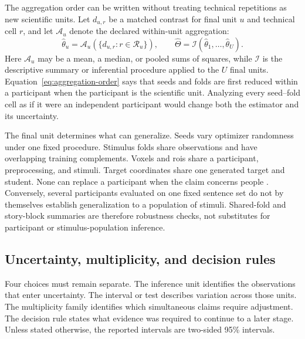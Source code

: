The aggregation order can be written without treating technical repetitions as new scientific units.
Let \(d_{u,r}\) be a matched contrast for final unit \(u\) and technical cell \(r\), and let \(\mathcal A_u\) denote the declared within-unit aggregation:
\begin{equation}
  \widehat\theta_u
  =
  \mathcal A_u\!\left(\{d_{u,r}:r\in\mathcal R_u\}\right),
  \qquad
  \widehat\Theta
  =
  \mathcal I\!\left(\widehat\theta_1,\ldots,\widehat\theta_U\right).
  \label{eq:aggregation-order}
\end{equation}
Here \(\mathcal A_u\) may be a mean, a median, or pooled sums of squares, while \(\mathcal I\) is the descriptive summary or inferential procedure applied to the \(U\) final units.
Equation~\ref{eq:aggregation-order} says that seeds and folds are first reduced within a participant when the participant is the scientific unit.
Analyzing every seed--fold cell as if it were an independent participant would change both the estimator and its uncertainty.

The final unit determines what can generalize.
Seeds vary optimizer randomness under one fixed procedure.
Stimulus folds share observations and have overlapping training complements.
Voxels and \acp{roi} share a participant, preprocessing, and stimuli.
Target coordinates share one generated target and student.
None can replace a participant when the claim concerns people \autocite{lazic2010}.
Conversely, several participants evaluated on one fixed sentence set do not by themselves establish generalization to a population of stimuli.
Shared-fold and story-block summaries are therefore robustness checks, not substitutes for participant or stimulus-population inference. 

\subsection{Uncertainty, multiplicity, and decision rules}

Four choices must remain separate.
The inference unit identifies the observations that enter uncertainty.
The interval or test describes variation across those units.
The multiplicity family identifies which simultaneous claims require adjustment.
The decision rule states what evidence was required to continue to a later stage.
Unless stated otherwise, the reported intervals are two-sided 95\% intervals.

